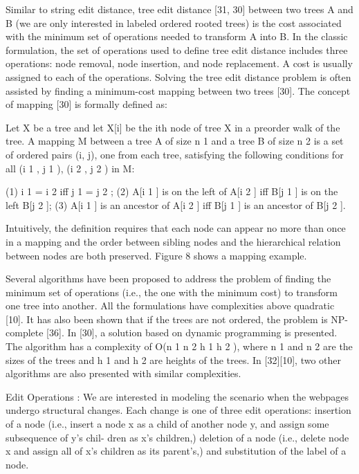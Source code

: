 
Similar to string edit distance, tree edit distance [31, 30] between
two trees A and B (we are only interested in labeled ordered
rooted trees) is the cost associated with the minimum set of
operations needed to transform A into B. In the classic
formulation, the set of operations used to define tree edit distance
includes three operations: node removal, node insertion, and node
replacement. A cost is usually assigned to each of the operations.
Solving the tree edit distance problem is often assisted by finding
a minimum-cost mapping between two trees [30]. The concept of
mapping [30] is formally defined as:

Let X be a tree and let X[i] be the ith node of tree X in a preorder
walk of the tree. A mapping M between a tree A of size n 1 and a
tree B of size n 2 is a set of ordered pairs (i, j), one from each tree,
satisfying the following conditions for all (i 1 , j 1 ), (i 2 , j 2 ) in M:

(1) i 1 = i 2 iff j 1 = j 2 ;
(2) A[i 1 ] is on the left of A[i 2 ] iff B[j 1 ] is on the left B[j 2 ];
(3) A[i 1 ] is an ancestor of A[i 2 ] iff B[j 1 ] is an ancestor of B[j 2 ].

Intuitively, the definition requires that each node can appear no
more than once in a mapping and the order between sibling nodes
and the hierarchical relation between nodes are both preserved.
Figure 8 shows a mapping example.

Several algorithms have been proposed to address the problem of
finding the minimum set of operations (i.e., the one with the
minimum cost) to transform one tree into another. All the
formulations have complexities above quadratic [10]. It has also
been shown that if the trees are not ordered, the problem is NP-
complete [36]. In [30], a solution based on dynamic programming
is presented. The algorithm has a complexity of O(n 1 n 2 h 1 h 2 ),
where n 1 and n 2 are the sizes of the trees and h 1 and h 2 are heights
of the trees. In [32][10], two other algorithms are also presented
with similar complexities.


Edit Operations : We are interested in modeling the scenario when
the webpages undergo structural changes. Each change is one of
three edit operations: insertion of a node (i.e., insert a node x as a
child of another node y, and assign some subsequence of y’s chil-
dren as x’s children,) deletion of a node (i.e., delete node x and
assign all of x’s children as its parent’s,) and substitution of the
label of a node.

